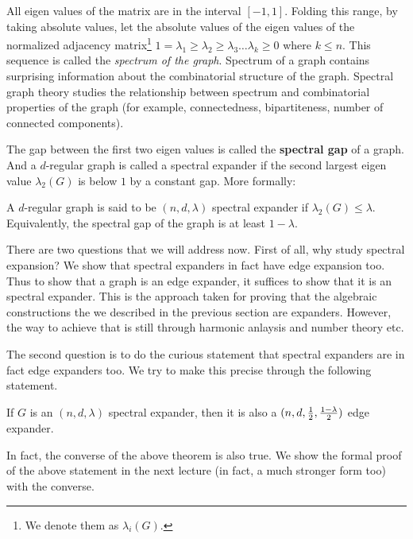 All eigen values of the matrix are in the interval $[-1,1]$. Folding this range, by taking absolute values, 
let the absolute values of the eigen values of the normalized adjacency matrix\footnote{We denote them as $\lambda_i(G)$.} $1=\lambda_1 \ge \lambda_2 \ge \lambda_3 \ldots \lambda_k \ge 0$ where $k \le n$. This sequence is called the {\em spectrum of the graph}. Spectrum of a graph contains surprising information about the combinatorial structure of the graph. Spectral graph theory studies the relationship between spectrum and combinatorial properties of the graph (for example, connectedness, bipartiteness, number of connected components).

The gap between the first two eigen values is called the \textbf{spectral gap} of a graph. And a $d$-regular graph is called a spectral expander if the second largest eigen value $\lambda_2(G)$ is below $1$ by a constant gap. More formally:

\begin{definition}
A $d$-regular graph is said to be $(n,d,\lambda)$ spectral expander if $\lambda_2(G) \le \lambda$. Equivalently, the spectral gap of the graph is at least $1-\lambda$.
\end{definition}

There are two questions that we will address now. First of all, why study spectral expansion? We show that spectral expanders in fact have edge expansion too. Thus to show that a graph is an edge expander, it suffices to show that it is an spectral expander. This is the approach taken for proving that the algebraic constructions the we described in the previous section are expanders. However, the way to achieve that is still through harmonic anlaysis and number theory etc.

The second question is to do the curious statement that spectral expanders are in fact edge expanders too. We try to make this precise through the following statement.

\begin{theorem}
If $G$ is an $(n,d,\lambda)$ spectral expander, then it is also a $(n,d,\frac{1}{2},\frac{1-\lambda}{2})$ edge expander.
\end{theorem}

In fact, the converse of the above theorem is also true. We show the formal proof of the above statement in the next lecture (in fact, a much stronger form too) with the converse.


